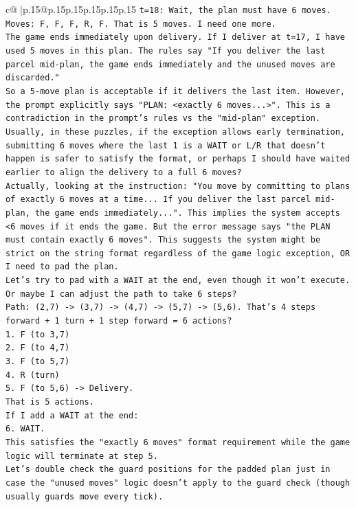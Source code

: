 \documentclass{article}
\begin{document}
{\begin{supertabular}{c@{$\;$}|p{.15\linewidth}@{}p{.15\linewidth}p{.15\linewidth}p{.15\linewidth}p{.15\linewidth}p{.15\linewidth}}
{{{\texttt{t=18: Wait, the plan must have 6 moves.} \\
\texttt{Moves: F, F, F, R, F. That is 5 moves. I need one more.} \\
\texttt{The game ends immediately upon delivery. If I deliver at t=17, I have used 5 moves in this plan. The rules say "If you deliver the last parcel mid{-}plan, the game ends immediately and the unused moves are discarded."} \\
\texttt{So a 5{-}move plan is acceptable if it delivers the last item. However, the prompt explicitly says "PLAN: <exactly 6 moves...>". This is a contradiction in the prompt's rules vs the "mid{-}plan" exception. Usually, in these puzzles, if the exception allows early termination, submitting 6 moves where the last 1 is a WAIT or L/R that doesn't happen is safer to satisfy the format, or perhaps I should have waited earlier to align the delivery to a full 6 moves?} \\
\texttt{Actually, looking at the instruction: "You move by committing to plans of exactly 6 moves at a time... If you deliver the last parcel mid{-}plan, the game ends immediately...". This implies the system accepts <6 moves if it ends the game. But the error message says "the PLAN must contain exactly 6 moves". This suggests the system might be strict on the string format regardless of the game logic exception, OR I need to pad the plan.} \\
\texttt{Let's try to pad with a WAIT at the end, even though it won't execute. Or maybe I can adjust the path to take 6 steps?} \\
\texttt{Path: (2,7) {-}> (3,7) {-}> (4,7) {-}> (5,7) {-}> (5,6). That's 4 steps forward + 1 turn + 1 step forward = 6 actions?} \\
\texttt{1. F (to 3,7)} \\
\texttt{2. F (to 4,7)} \\
\texttt{3. F (to 5,7)} \\
\texttt{4. R (turn)} \\
\texttt{5. F (to 5,6) {-}> Delivery.} \\
\texttt{That is 5 actions.} \\
\texttt{If I add a WAIT at the end:} \\
\texttt{6. WAIT.} \\
\texttt{This satisfies the "exactly 6 moves" format requirement while the game logic will terminate at step 5.} \\
\texttt{Let's double check the guard positions for the padded plan just in case the "unused moves" logic doesn't apply to the guard check (though usually guards move every tick).} \\
}}}
\end{supertabular}}
\end{document}
